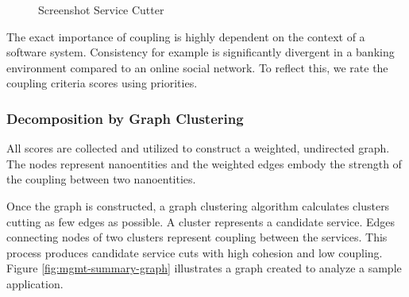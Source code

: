\begin{figure}[H]
	\caption{Screenshot Service Cutter}
	\label{fig:ServiceCutter-mgmt-summary}
\end{figure}

The exact importance of coupling is highly dependent on the context of a software system. Consistency for example is significantly divergent in a banking environment compared to an online social network. To reflect this, we rate the coupling criteria scores using priorities.

\subsubsection{Decomposition by Graph Clustering}

All scores are collected and utilized to construct a weighted, undirected graph. The nodes represent nanoentities and the weighted edges embody the strength of the coupling between two nanoentities.	

Once the graph is constructed, a graph clustering algorithm calculates clusters cutting as few edges as possible. A cluster represents a candidate service. Edges connecting nodes of two clusters represent coupling between the services. This process produces candidate service cuts with high cohesion and low coupling. Figure \ref{fig:mgmt-summary-graph} illustrates a graph created to analyze a sample application.

